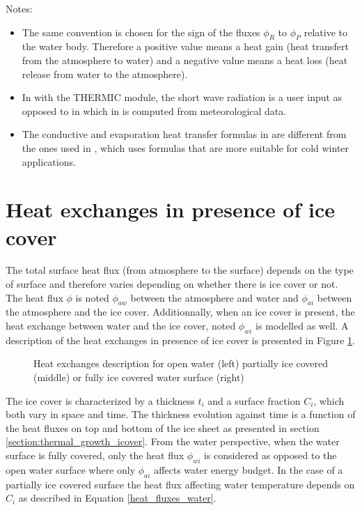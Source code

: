 \begin{WarningBlock}{Notes:}
\begin{itemize}
\item The same convention is chosen for the sign of the fluxes $\phi_R$ to $\phi_P$ relative to the water body. Therefore a positive value means a heat gain (heat transfert from the atmosphere to water) and a negative value means a heat loss (heat release from water to the atmosphere).
\item In \waqtel with the THERMIC module, the short wave radiation is a user input as opposed to \khione in which in is computed from meteorological data.
\item The conductive and evaporation heat transfer formulas in  are different from the ones used in \khione, which uses formulas that are more suitable for cold winter applications.
\end{itemize}
\end{WarningBlock}

\section{Heat exchanges in presence of ice cover}

The total surface heat flux (from atmosphere to the surface) depends on the type of surface and therefore varies
depending on whether there is ice cover or not.
The heat flux $\phi$ is noted $\phi_{aw}$ between the atmosphere and water and
$\phi_{ai}$ between the atmosphere and the ice cover.
Additionnally, when an ice cover is present, the heat exchange between water and the ice cover, noted $\phi_{wi}$ is modelled as well.
A description of the heat exchanges in presence of ice cover is presented in Figure \ref{fig:heat_exchanges_icover}.

\begin{figure}[H]
    \begin{center}
    \end{center}
    \caption{Heat exchanges description for open water (left) partially ice covered (middle) or fully ice covered water surface (right)}
    \label{fig:heat_exchanges_icover}
\end{figure}

The ice cover is characterized by a thickness $t_i$ and a surface fraction $C_i$, which both vary in space and time.
The thickness evolution against time is a function of the heat fluxes on top and bottom of the ice sheet as presented in section \ref{section:thermal_growth_icover}.
From the water perspective, when the water surface is fully covered, only the heat flux $\phi_{wi}$ is considered as opposed to the open water surface where only $\phi_{ai}$ affects water energy budget.
In the case of a partially ice covered surface the heat flux affecting water temperature depends on $C_i$ as described in Equation \ref{heat_fluxes_water}.


